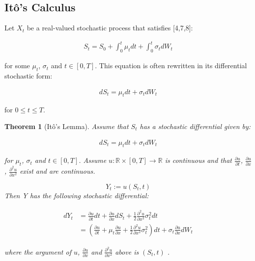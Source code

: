 \documentclass[12pt,twoside]{reedthesis}
\newtheorem{theorem}{Theorem}[section]
\theoremstyle{definition}
\theoremstyle{definition}
\theoremstyle{remark}
\begin{document}
  \subsection{Itô's Calculus}\label{itos-calculus}
  
  Let \(X_{t}\) be a real-valued stochastic process that satisfies
  {[}4,7,8{]}:
  
  \begin{align}
  S_t = S_0 + \int_{0}^{t} \mu_t dt + \int_{0}^{t} \sigma_t dW_t
  \end{align}
  
  \noindent
  for some \(\mu_t\), \(\sigma_t\) and \(t \in [0,T]\). This equation is
  often rewritten in its differential stochastic form:
  
  \begin{align}
  dS_t = \mu_t dt + \sigma_t dW_t 
  \end{align}
  
  \noindent
  for \(0 \leq t \leq T\).
  
  \begin{theorem}[Itô's Lemma]
  Assume that $S_t$ has a stochastic differential given by:
  
  \begin{align}
  dS_t = \mu_t dt + \sigma_t dW_t 
  \end{align}
  
  \noindent
  for $\mu_t$, $\sigma_t$ and $t \in [0,T]$. Assume $u: \mathbb{R} \times [0, T] \rightarrow \mathbb{R}$ is continuous and that $\frac{\partial u}{\partial t}$, $\frac{\partial u}{\partial x}$, $\frac{\partial^2 u}{\partial x^2}$ exist and are continuous.
  
  $$Y_t := u(S_t, t)$$
  \noindent
  Then Y has the following stochastic differential:
  
  \begin{align} 
  \label{eq:ito}
  \begin{split}
      dY_t &= \frac{\partial u}{\partial t}dt + \frac{\partial u}{\partial x} dS_t + \frac{1}{2}\frac{\partial^2 u}{\partial x^2}\sigma_t^2 dt  \\[10pt] 
      &= \left( \frac{\partial u}{\partial t} + \mu_t \frac{\partial u}{\partial x} + \frac{1}{2}\frac{\partial^2 u}{\partial x^2}\sigma_t^2 \right) dt + \sigma_t \frac{\partial u}{\partial x} dW_t
  \end{split}
  \end{align}
  
  \noindent 
  where the argument of $u$, $\frac{\partial u}{\partial x}$ and $\frac{\partial^2 u}{\partial x^2}$ above is $\left( S_t, t \right)$ .
  \end{theorem}
  
\end{document}
